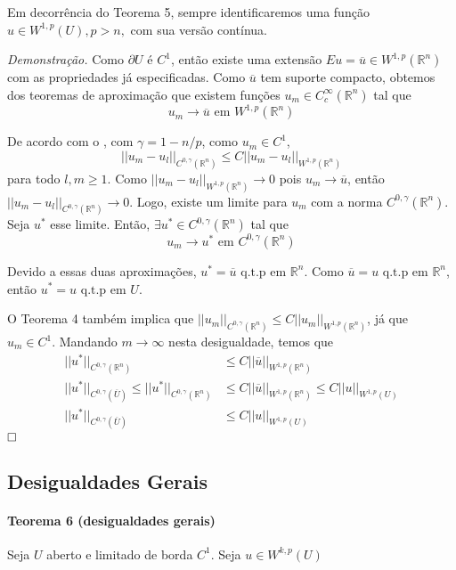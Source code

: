 \documentclass[a4paper, 11pt]{article}
\newcommand{\qed}{$\hfill\square$}
\newcommand{\Rn}{{\mathbb{R}^n}}
\newcommand{\prn}{{(\mathbb{R}^n)}}
\newcommand{\pu}{\partial U}
\begin{document}
Em decorrência do Teorema 5, sempre identificaremos uma função $u \in W^{1,p}(U), p>n,$ com sua versão contínua.

\textit{Demonstração.} Como $\pu$ é $C^1$, então existe uma extensão $Eu = \overline{u} \in W^{1,p}(\Rn)$ com as propriedades já especificadas. Como $\overline{u}$ tem suporte compacto, obtemos dos teoremas de aproximação que existem funções $ u_m \in C^\infty_c(\Rn) $ tal que \[ u_m \rightarrow \overline{u} \text{ em } W^{1,p}(\Rn) \]

De acordo com o , com $\gamma = 1 - n/p$, como $u_m \in C^1$, \[ ||u_m - u_l||_{C^{0,\gamma}\prn} \leq C ||u_m - u_l||_{W^{1,p}\prn} \] para todo $l,m\geq1$.  Como $||u_m - u_l||_{W^{1,p}\prn} \rightarrow 0$ pois $u_m \rightarrow \overline{u}$, então $||u_m - u_l||_{C^{0,\gamma}\prn} \rightarrow 0$. Logo, existe um limite para $u_m$ com a norma $C^{0,\gamma}\prn$. Seja $u^*$ esse limite. Então, $\exists u^* \in C^{0,\gamma}\prn$ tal que \[ u_m \rightarrow u^* \text{ em }C^{0,\gamma}\prn  \]

Devido a essas duas aproximações, $u^* = \overline{u} \text{ q.t.p em } \Rn$.  Como $\overline{u}=u \text{ q.t.p em } \Rn$, então $u^* = u \text{ q.t.p em } U$.

O Teorema 4 também implica que $||u_m||_{C^{0,\gamma}\prn} \leq C ||u_m||_{W^{1,p}\prn}$, já que $u_m \in C^1$. Mandando $m \rightarrow \infty$ nesta desigualdade, temos que \begin{align*}
	 ||u^*||_{C^{0,\gamma}\prn} &\leq  C ||\overline{u}||_{W^{1,p}\prn}  \\
	  ||u^*||_{C^{0,\gamma}(\overline{U})}  \leq ||u^*||_{C^{0,\gamma}\prn} &\leq  C ||\overline{u}||_{W^{1,p}\prn} \leq C ||u||_{W^{1,p}(U)} \\
	  ||u^*||_{C^{0,\gamma}(\overline{U})}  &\leq C ||u||_{W^{1,p}(U)}
\end{align*}
\qed


\subsection{Desigualdades Gerais}

\paragraph{Teorema 6 (desigualdades gerais)} Seja $U$ aberto e limitado de borda $C^1$. Seja $u \in W^{k,p}(U)$
\end{document}
